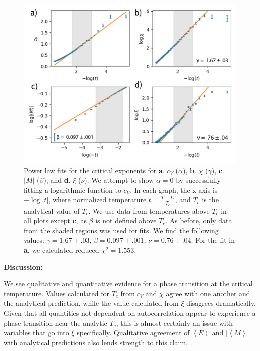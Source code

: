 \documentclass[letter,scriptaddress,twocolumn, prl,nofootinbib]{revtex4}
\newcommand{\submin}[1]{\left\langle #1 \right\rangle}
\begin{document}
\begin{figure}[h]
	\begin{center}
		\includegraphics[width=1\textwidth]{figs/lastfig.png}
		\caption{Power law fits for the critical exponents for \textbf{a}. $c_V$ ($\alpha$), \textbf{b}. $\chi$ ($\gamma$), \textbf{c}. $|M|$ ($\beta$), and \textbf{d}. $\xi$ ($\nu$). We attempt to show $\alpha = 0$ by successfully fitting a logarithmic function to $c_V$. In each graph, the x-axis is $-\log{|t|}$, where normalized temperature $t = \frac{T - T_c}{T_c}$, and $T_c$ is the analytical value of $T_c$. We use data from temperatures above $T_c$ in all plots except \textbf{c}, as $\beta$ is not defined above $T_c$. As before, only data from the shaded regions was used for fits. We find the following values: $\gamma = 1.67 \pm .03$, $\beta = 0.097 \pm .001$, $\nu = 0.76 \pm .04$. For the fit in \textbf{a}, we calculated reduced $\chi^2 = 1.553$.}
		\label{fig:fig5}
	\end{center}
\end{figure}

\textbf{Discussion:}

We see qualitative and quantitative evidence for a phase transition at the critical temperature. Values calculated for $T_c$ from $c_V$ and $\chi$ agree with one another and the analytical prediction, while the value calculated from $\xi$ disagrees dramatically. Given that all quantities not dependent on autocorrelation appear to experience a phase transition near the analytic $T_c$, this is almost certainly an issue with variables that go into $\xi$ specifically. Qualitative agreement of $\submin{E}$ and $|\submin{M}|$ with analytical predictions also lends strength to this claim.
\end{document}
